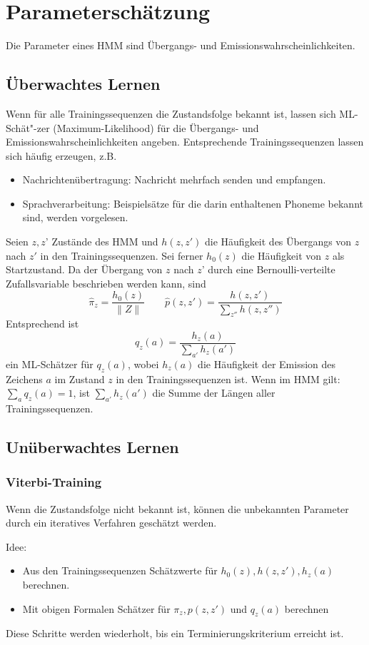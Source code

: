\section{Parameterschätzung}
Die Parameter eines HMM sind Übergangs- und Emissionswahrscheinlichkeiten.

\subsection{Überwachtes Lernen}
Wenn für alle Trainingssequenzen die Zustandsfolge bekannt ist, lassen sich ML-Schät"-zer (Maximum-Likelihood) für die Übergangs- und Emissionswahrscheinlichkeiten angeben.
Entsprechende Trainingssequenzen lassen sich häufig erzeugen, z.B.
\begin{itemize}
	\item Nachrichtenübertragung: Nachricht mehrfach senden und empfangen.
	\item Sprachverarbeitung: Beispielsätze für die darin enthaltenen Phoneme bekannt sind, werden vorgelesen.
\end{itemize}
Seien \(z,z\)' Zustände des HMM und \(h(z,z')\) die Häufigkeit des Übergangs von \(z\) nach \(z'\) in den Trainingssequenzen.
Sei ferner \(h_0(z)\) die Häufigkeit von \(z\) als Startzustand.
Da der Übergang von \(z\) nach \(z\)' durch eine Bernoulli-verteilte Zufallsvariable beschrieben werden kann, sind 
\[\hat\pi_z=\frac{h_0(z)}{\|Z\|} \qquad \hat{p}(z,z')=\frac{h(z,z')}{\sum_{z''} h(z,z'')}\]
Entsprechend ist
\[\hat{q}_z(a)=\frac{h_z(a)}{\sum_{a'} h_z(a')}\]
ein ML-Schätzer für \(q_z(a)\), wobei \(h_z(a)\) die Häufigkeit der Emission des Zeichens \(a\) im Zustand \(z\) in den Trainingssequenzen ist.
Wenn im HMM gilt: \(\sum_a q_z(a)=1\), ist \(\sum_{a'} h_z(a')\) die Summe der Längen aller Trainingssequenzen.

\subsection{Unüberwachtes Lernen}
\subsubsection{Viterbi-Training}
Wenn die Zustandsfolge nicht bekannt ist, können die unbekannten Parameter durch ein iteratives Verfahren geschätzt werden.

Idee: 
\begin{itemize}
	\item Aus den Trainingssequenzen Schätzwerte für \(h_0(z), h(z,z'), h_z(a)\) berechnen.
	\item Mit obigen Formalen Schätzer für \(\pi_z, p(z,z')\) und \(q_z(a)\) berechnen
\end{itemize}
Diese Schritte werden wiederholt, bis ein Terminierungskriterium erreicht ist.

